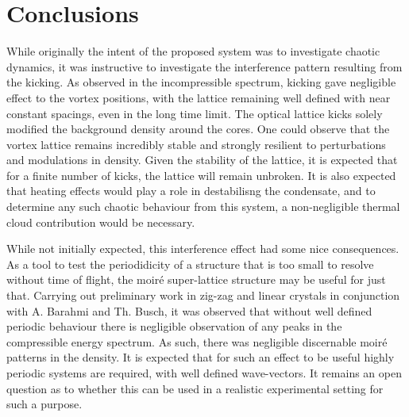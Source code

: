\section{Conclusions}
\label{sec:ch5_conc}
While originally the intent of the proposed system was to investigate chaotic dynamics, it was instructive to investigate the interference pattern resulting from the kicking. As observed in the incompressible spectrum, kicking gave negligible effect to the vortex positions, with the lattice remaining well defined with near constant spacings, even in the long time limit. The optical lattice kicks solely modified the background density around the cores. One could observe that the vortex lattice remains incredibly stable and strongly resilient to perturbations and modulations in density. Given the stability of the lattice, it is expected that for a finite number of kicks, the lattice will remain unbroken. It is also expected that heating effects would play a role in destabilisng the condensate, and to determine any such chaotic behaviour from this system, a non-negligible thermal cloud contribution would be necessary.

While not initially expected, this interference effect had some nice consequences. As a tool to test the periodidicity of a structure that is too small to resolve without time of flight, the moir\'e super-lattice structure may be useful for just that. Carrying out preliminary work in zig-zag and linear crystals in conjunction with A. Barahmi and Th. Busch, it was observed that without well defined periodic behaviour there is negligible observation of any peaks in the compressible energy spectrum. As such, there was negligible discernable moir\'e patterns in the density. It is expected that for such an effect to be useful highly periodic systems are required, with well defined wave-vectors. It remains an open question as to whether this can be used in a realistic experimental setting for such a purpose.
